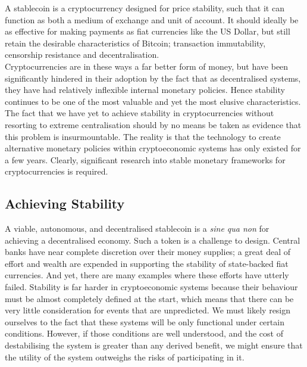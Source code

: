 \noindent A stablecoin is a cryptocurrency designed for price stability, such that it can function as
both a medium of exchange and unit of account. It should ideally be as effective for making payments
as fiat currencies like the US Dollar, but still retain the desirable characteristics of Bitcoin;
transaction immutability, censorship resistance and decentralisation. \\

\noindent Cryptocurrencies are in these ways a far better form of money, but have been significantly hindered
in their adoption by the fact that as decentralised systems, they have had relatively inflexible internal
monetary policies. Hence stability continues to be one of the most valuable and yet the most elusive
characteristics.
The fact that we have yet to achieve stability in cryptocurrencies without resorting to extreme
centralisation should by no means be taken as evidence that this problem is insurmountable.
The reality is that the technology to create alternative monetary policies within
cryptoeconomic systems has only existed for a few years. Clearly, significant research into stable monetary
frameworks for cryptocurrencies is required. \\

\subsection{Achieving Stability}

\noindent A viable, autonomous, and decentralised stablecoin is a \textit{sine qua non} for achieving a
decentralised economy.
Such a token is a challenge to design. Central banks have near complete discretion over their money supplies;
a great deal of effort and wealth are expended in supporting the stability of state-backed fiat currencies.
And yet, there are many examples where these efforts have utterly failed.
Stability is far harder in cryptoeconomic systems because their behaviour must be almost completely
defined at the start, which means that there can be very little consideration for events that are unpredicted.
We must likely resign ourselves to the fact that these systems will be only functional under certain conditions.
However, if those conditions are well understood, and the cost of destabilising the system is greater than
any derived benefit, we might ensure that the utility of the system outweighs the risks of participating in it. \\

